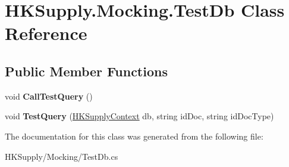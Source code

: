 \hypertarget{class_h_k_supply_1_1_mocking_1_1_test_db}{}\section{H\+K\+Supply.\+Mocking.\+Test\+Db Class Reference}
\label{class_h_k_supply_1_1_mocking_1_1_test_db}
\subsection*{Public Member Functions}
\begin{DoxyCompactItemize}
\item 
\mbox{\label{class_h_k_supply_1_1_mocking_1_1_test_db_a6a4ffbdd9da7bbb2afaf8ce91931781c}} 
void {\bfseries Call\+Test\+Query} ()
\item 
\mbox{\label{class_h_k_supply_1_1_mocking_1_1_test_db_a0fee0e427aae0bb4f4e5022e32483901}} 
void {\bfseries Test\+Query} (\mbox{\hyperlink{class_h_k_supply_1_1_d_b_1_1_h_k_supply_context}{H\+K\+Supply\+Context}} db, string id\+Doc, string id\+Doc\+Type)
\end{DoxyCompactItemize}


The documentation for this class was generated from the following file\+:\begin{DoxyCompactItemize}
\item 
H\+K\+Supply/\+Mocking/Test\+Db.\+cs\end{DoxyCompactItemize}
